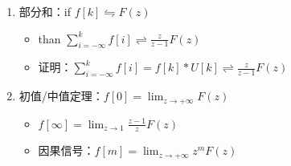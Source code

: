\documentclass[UTF8]{ctexart}
\begin{document}
\begin{enumerate}[label=(\arabic*),itemindent=0pt,labelindent=\parindent,labelwidth=2em,labelsep=5pt,leftmargin=*]
\begin{itemize}[label=,left=3.8em]
\begin{figure}[h]
                \end{figure}
        \end{itemize}
  \item 部分和：if $f[k]\leftrightharpoons F(z)$ \par
        \begin{itemize}[label=,left=3.5em]
          \item than $\sum_{i=-\infty}^{k}f[i]\rightleftharpoons{\frac{z}{z-1}F(z)}$
          \item 证明：$\sum_{i=-\infty}^{k}f[i]=f[k]*U[k]\rightleftharpoons{\frac{z}{z-1}F(z)}$
        \end{itemize}
  \item 初值/中值定理：$f[0]=\lim_{z\to +\infty}F(z)$
        \begin{itemize}[label=,left=6.9em]
          \item $f[\infty]=\lim_{z\to 1}\frac{z-1}{z}F(z)$
          \item 因果信号：$f[m]=\lim_{z\to +\infty}z^m F(z)$
        \end{itemize}
\end{enumerate}\par
\end{document}
